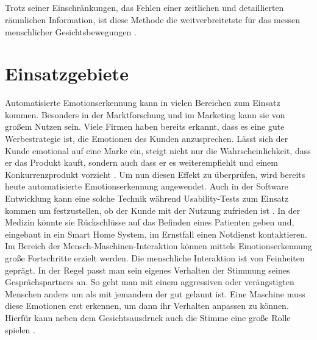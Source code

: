 \documentclass[12pt,a4paper,headinclude,twoside, plainheadsepline, open=right,numbers=noenddot]{scrreprt}
\begin{document}
\paragraph{}
Trotz seiner Einschränkungen, das Fehlen einer zeitlichen und detaillierten räumlichen Information, ist diese Methode die weitverbreitetste für das messen menschlicher Gesichtsbewegungen \cite{Essa1997CodingAnalysis}.




\chapter{Einsatzgebiete}
\label{Einsatzgebiete}
Automatisierte Emotionserkennung kann in vielen Bereichen zum Einsatz kommen. Besonders in der Marktforschung und im Marketing kann sie von großem Nutzen sein. Viele Firmen haben bereits erkannt, dass es eine gute Werbestrategie ist, die Emotionen des Kunden anzusprechen. Lässt sich der Kunde emotional auf eine Marke ein, steigt nicht nur die Wahrscheinlichkeit, dass er das Produkt kauft, sondern auch dass er es weiterempfiehlt und einem Konkurrenzprodukt vorzieht \cite{Consoli2010Marketing}. Um nun diesen Effekt zu überprüfen, wird bereits heute automatisierte Emotionserkennung angewendet. Auch in der Software Entwicklung kann eine solche Technik während Usability-Tests zum Einsatz kommen um festzustellen, ob der Kunde mit der Nutzung zufrieden ist \cite{Kolakowska2014EmotionRecognitionAndApplications}.
In der Medizin könnte sie Rückschlüsse auf das Befinden eines Patienten geben und, eingebaut in ein Smart Home System, im Ernstfall einen Notdienst kontaktieren. \\Im Bereich der Mensch-Maschinen-Interaktion können mittels Emotionserkennung große Fortschritte erzielt werden. Die menschliche Interaktion ist von Feinheiten geprägt. In der Regel passt man sein eigenes Verhalten der Stimmung seines Gesprächspartners an. So geht man mit einem aggressiven oder verängstigten Menschen anders um als mit jemandem der gut gelaunt ist. Eine Maschine muss diese Emotionen erst erkennen, um dann ihr Verhalten anpassen zu können. Hierfür kann neben dem Gesichtsausdruck auch die Stimme eine große Rolle spielen \cite{Brand2012AutomatischeEmotionserkennung}. 
\end{document}
